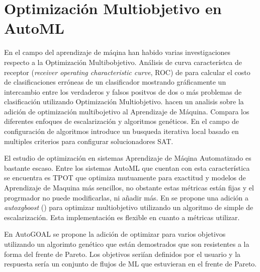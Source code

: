 

\section{Optimizaci\'on Multiobjetivo en AutoML}


En el campo del aprendizaje de m\'aqina han habido varias investigaciones respecto a la Optimizaci\'on Multibobjetivo.  An\'alisis de curva caracter\'istca de receptor (\textit{receiver operating characteristic curve}, ROC) de \cite{everson2006multi} para calcular el costo de clasificaciones err\'oneas de un clasificador mostrando gr\'aficamente un intercambio entre los verdaderos y falsos positvos de dos o m\'as problemas de clasificaci\'on utilizando Optimizaci\'on Multiobjetivo. 
\cite{jin2008pareto} hacen un analisis sobre la adici\'on de optimizaci\'on multibojetivo al Aprendizaje de M\'aquina. Compara los diferentes enfoques de escalarizaci\'on y algoritmos gen\'eticos.
En el campo de configuraci\'on de algoritmos \cite{blot2016mo} introduce un busqueda iterativa local basado en multiples criterios para configurar solucionadores SAT.

El estudio de optimizaci\'on en sistemas Aprendizaje de M\'aqina Automatizado es bastante escaso. Entre los sistemas AutoML que cuentan con esta caracter\'istica se encuentra es TPOT \cite{pmlr-v64-olson_tpot_2016} que optimiza mutuamente para exactitud y modelos de Aprendizaje de Maquina m\'as sencillos, no obstante estas m\'etricas est\'an fijas y el progrmador no puede modificarlas, ni a\~nadir m\'as.
En \cite{pfisterer2019multi} se propone una adici\'on a \textit{autoxgboost} (\cite{thomas2018automatic}) para optimizar multiobjetivo utilizando un algoritmo de simple de escalarizaci\'on. Esta implementaci\'on es flexible en cuanto a m\'etricas utilizar.

En AutoGOAL se propone la adici\'on de optimizar para varios objetivos utilizando un algorimto gen\'etico que est\'an demostrados que son resistentes a la forma del frente de Pareto. Los objetivos seri\'ian definidos por el usuario y la respuesta ser\'ia un conjunto de flujos de ML que estuvieran en el frente de Pareto.


